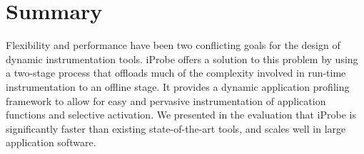 \section{Summary}
\label{sec:iProbeSummary}

Flexibility and performance have been two conflicting goals 
for the design of dynamic instrumentation tools.
iProbe offers a solution to this problem by using a two-stage process that offloads much of the complexity involved in run-time instrumentation to an offline stage. 
It provides a dynamic application profiling framework
to allow for easy and pervasive instrumentation of application functions
and selective activation. 
We presented in the evaluation that iProbe is significantly faster than existing state-of-the-art tools, and scales well in large application software.


